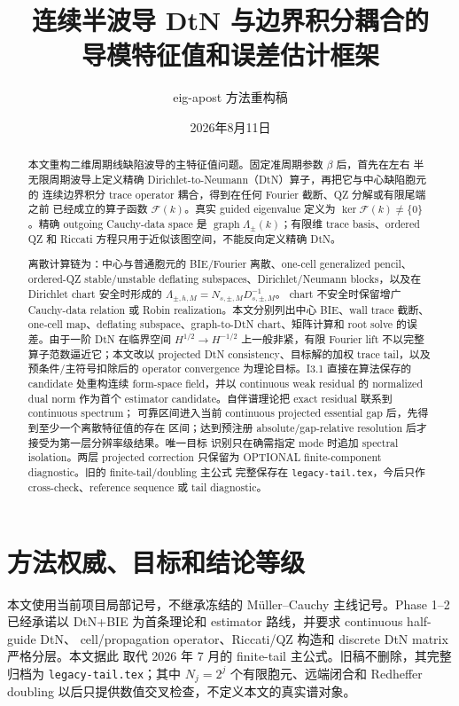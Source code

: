 \documentclass[UTF8,fontset=fandol,11pt,a4paper]{ctexart}
\title{连续半波导 DtN 与边界积分耦合的\\导模特征值和误差估计框架}
\author{eig-apost 方法重构稿}
\date{2026年8月11日}
\newcommand{\cF}{\mathcal F}
\begin{document}
\maketitle

\begin{abstract}
本文重构二维周期线缺陷波导的主特征值问题。固定准周期参数 $\beta$ 后，首先在左右
半无限周期波导上定义精确 Dirichlet-to-Neumann（DtN）算子，再把它与中心缺陷胞元的
连续边界积分 trace operator 耦合，得到在任何 Fourier 截断、QZ 分解或有限尾端之前
已经成立的算子函数 $\cF(k)$。真实 guided eigenvalue 定义为
$\ker\cF(k)\ne\{0\}$。精确 outgoing Cauchy-data space 是
$\operatorname{graph}\Lambda_\pm(k)$；有限维 trace basis、ordered QZ 和 Riccati
方程只用于近似该图空间，不能反向定义精确 DtN。

离散计算链为：中心与普通胞元的 BIE/Fourier 离散、one-cell generalized pencil、
ordered-QZ stable/unstable deflating subspaces、Dirichlet/Neumann blocks，以及在
Dirichlet chart 安全时形成的 $\Lambda_{\pm,h,M}=N_{s,\pm,M}D_{s,\pm,M}^{-1}$。
chart 不安全时保留增广 Cauchy-data relation 或 Robin realization。本文分别列出中心 BIE、wall
trace 截断、one-cell map、deflating subspace、graph-to-DtN chart、矩阵计算和 root
solve 的误差。由于一阶 DtN 在临界空间 $H^{1/2}\to H^{-1/2}$ 上一般非紧，有限 Fourier
lift 不以完整算子范数逼近它；本文改以 projected DtN consistency、目标解的加权 trace
tail，以及预条件/主符号扣除后的 operator convergence 为理论目标。I3.1 直接在算法保存的
candidate 处重构连续 form-space field，并以 continuous weak residual 的 normalized dual
norm 作为首个 estimator candidate。自伴谱理论把 exact residual 联系到 continuous spectrum；
可靠区间进入当前 continuous projected essential gap 后，先得到至少一个离散特征值的存在
区间；达到预注册 absolute/gap-relative resolution 后才接受为第一层分辨率级结果。唯一目标
识别只在确需指定 mode 时追加 spectral isolation。两层 projected correction 只保留为
OPTIONAL finite-component diagnostic。旧的 finite-tail/doubling 主公式
完整保存在 \texttt{legacy-tail.tex}，今后只作 cross-check、reference sequence 或 tail
diagnostic。
\end{abstract}

\section{方法权威、目标和结论等级}

本文使用当前项目局部记号，不继承冻结的 M\"uller--Cauchy 主线记号。Phase 1--2
已经承诺以 DtN+BIE 为首条理论和 estimator 路线，并要求 continuous half-guide DtN、
cell/propagation operator、Riccati/QZ 构造和 discrete DtN matrix 严格分层。本文据此
取代 2026 年 7 月的 finite-tail 主公式。旧稿不删除，其完整归档为
\texttt{legacy-tail.tex}；其中 $N_j=2^j$ 个有限胞元、远端闭合和 Redheffer doubling
以后只提供数值交叉检查，不定义本文的真实谱对象。
\end{document}
